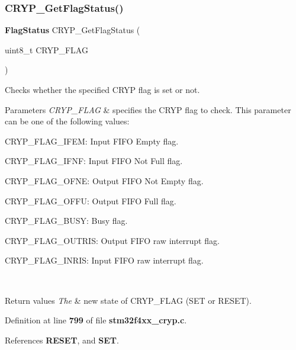 \subsubsection{C\+R\+Y\+P\+\_\+\+Get\+Flag\+Status()}
{\footnotesize\ttfamily \textbf{ Flag\+Status} C\+R\+Y\+P\+\_\+\+Get\+Flag\+Status (\begin{DoxyParamCaption}\item[{uint8\+\_\+t}]{C\+R\+Y\+P\+\_\+\+F\+L\+AG }\end{DoxyParamCaption})}



Checks whether the specified C\+R\+YP flag is set or not. 


\begin{DoxyParams}{Parameters}
{\em C\+R\+Y\+P\+\_\+\+F\+L\+AG} & specifies the C\+R\+YP flag to check. This parameter can be one of the following values\+: \begin{DoxyItemize}
\item C\+R\+Y\+P\+\_\+\+F\+L\+A\+G\+\_\+\+I\+F\+EM\+: Input F\+I\+FO Empty flag. \item C\+R\+Y\+P\+\_\+\+F\+L\+A\+G\+\_\+\+I\+F\+NF\+: Input F\+I\+FO Not Full flag. \item C\+R\+Y\+P\+\_\+\+F\+L\+A\+G\+\_\+\+O\+F\+NE\+: Output F\+I\+FO Not Empty flag. \item C\+R\+Y\+P\+\_\+\+F\+L\+A\+G\+\_\+\+O\+F\+FU\+: Output F\+I\+FO Full flag. \item C\+R\+Y\+P\+\_\+\+F\+L\+A\+G\+\_\+\+B\+U\+SY\+: Busy flag. \item C\+R\+Y\+P\+\_\+\+F\+L\+A\+G\+\_\+\+O\+U\+T\+R\+IS\+: Output F\+I\+FO raw interrupt flag. \item C\+R\+Y\+P\+\_\+\+F\+L\+A\+G\+\_\+\+I\+N\+R\+IS\+: Input F\+I\+FO raw interrupt flag. \end{DoxyItemize}
\\
\hline
\end{DoxyParams}

\begin{DoxyRetVals}{Return values}
{\em The} & new state of C\+R\+Y\+P\+\_\+\+F\+L\+AG (S\+ET or R\+E\+S\+ET). \\
\hline
\end{DoxyRetVals}


Definition at line \textbf{ 799} of file \textbf{ stm32f4xx\+\_\+cryp.\+c}.



References \textbf{ R\+E\+S\+ET}, and \textbf{ S\+ET}.


